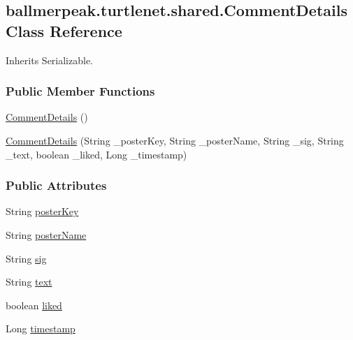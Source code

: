 \hypertarget{classballmerpeak_1_1turtlenet_1_1shared_1_1CommentDetails}{\subsection{ballmerpeak.\-turtlenet.\-shared.\-Comment\-Details Class Reference}
\label{classballmerpeak_1_1turtlenet_1_1shared_1_1CommentDetails}
}


Inherits Serializable.

\subsubsection*{Public Member Functions}
\begin{DoxyCompactItemize}
\item 
\hyperlink{classballmerpeak_1_1turtlenet_1_1shared_1_1CommentDetails_a423ee072cece507d02cbc57f41152aa2}{Comment\-Details} ()
\item 
\hyperlink{classballmerpeak_1_1turtlenet_1_1shared_1_1CommentDetails_aea01f179b2be192bdbf1c78035fd13ea}{Comment\-Details} (String \-\_\-poster\-Key, String \-\_\-poster\-Name, String \-\_\-sig, String \-\_\-text, boolean \-\_\-liked, Long \-\_\-timestamp)
\end{DoxyCompactItemize}
\subsubsection*{Public Attributes}
\begin{DoxyCompactItemize}
\item 
String \hyperlink{classballmerpeak_1_1turtlenet_1_1shared_1_1CommentDetails_a018d0738dd22703504c33b3bb6f8871a}{poster\-Key}
\item 
String \hyperlink{classballmerpeak_1_1turtlenet_1_1shared_1_1CommentDetails_a0feb9ab9c020b33ca5053ae2d6992b44}{poster\-Name}
\item 
String \hyperlink{classballmerpeak_1_1turtlenet_1_1shared_1_1CommentDetails_a6512dd32f4aab495d61c7592e8e38583}{sig}
\item 
String \hyperlink{classballmerpeak_1_1turtlenet_1_1shared_1_1CommentDetails_a4aa59661e2b3ef7c1a3d25e38c53d7bf}{text}
\item 
boolean \hyperlink{classballmerpeak_1_1turtlenet_1_1shared_1_1CommentDetails_a7aa48bc7182ff337eba405d2d7bb053f}{liked}
\item 
Long \hyperlink{classballmerpeak_1_1turtlenet_1_1shared_1_1CommentDetails_a8ac94ee627e504421f05caf66e592aff}{timestamp}
\end{DoxyCompactItemize}


